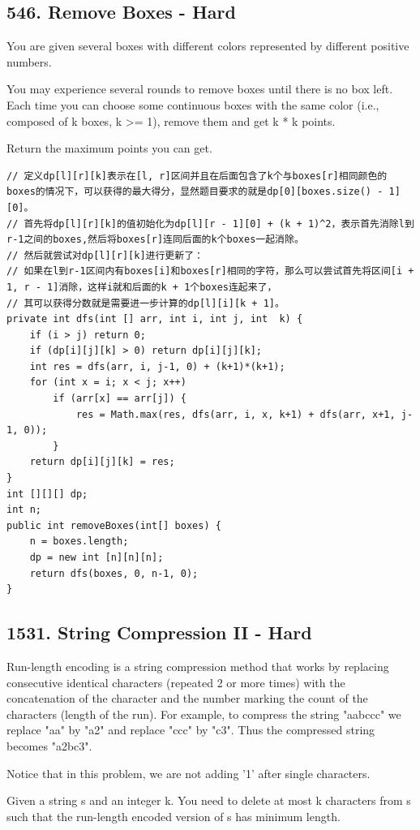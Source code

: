 \documentclass[9pt, b5paaper]{book}
\begin{document}
\subsection{546. Remove Boxes - Hard}
\label{sec-1-4-35}
You are given several boxes with different colors represented by different positive numbers.

You may experience several rounds to remove boxes until there is no box left. Each time you can choose some continuous boxes with the same color (i.e., composed of k boxes, k >= 1), remove them and get k * k points.

Return the maximum points you can get.
\begin{verbatim}
// 定义dp[l][r][k]表示在[l, r]区间并且在后面包含了k个与boxes[r]相同颜色的boxes的情况下，可以获得的最大得分，显然题目要求的就是dp[0][boxes.size() - 1][0]。
// 首先将dp[l][r][k]的值初始化为dp[l][r - 1][0] + (k + 1)^2，表示首先消除l到r-1之间的boxes,然后将boxes[r]连同后面的k个boxes一起消除。
// 然后就尝试对dp[l][r][k]进行更新了：
// 如果在l到r-1区间内有boxes[i]和boxes[r]相同的字符，那么可以尝试首先将区间[i + 1, r - 1]消除，这样i就和后面的k + 1个boxes连起来了，
// 其可以获得分数就是需要进一步计算的dp[l][i][k + 1]。
private int dfs(int [] arr, int i, int j, int  k) {
    if (i > j) return 0;
    if (dp[i][j][k] > 0) return dp[i][j][k];
    int res = dfs(arr, i, j-1, 0) + (k+1)*(k+1);
    for (int x = i; x < j; x++) 
        if (arr[x] == arr[j]) {
            res = Math.max(res, dfs(arr, i, x, k+1) + dfs(arr, x+1, j-1, 0));
        }
    return dp[i][j][k] = res;
}
int [][][] dp;
int n;
public int removeBoxes(int[] boxes) {
    n = boxes.length;
    dp = new int [n][n][n];
    return dfs(boxes, 0, n-1, 0);
}
\end{verbatim}
\subsection{1531. String Compression II - Hard}
\label{sec-1-4-36}
Run-length encoding is a string compression method that works by replacing consecutive identical characters (repeated 2 or more times) with the concatenation of the character and the number marking the count of the characters (length of the run). For example, to compress the string "aabccc" we replace "aa" by "a2" and replace "ccc" by "c3". Thus the compressed string becomes "a2bc3".

Notice that in this problem, we are not adding '1' after single characters.

Given a string s and an integer k. You need to delete at most k characters from s such that the run-length encoded version of s has minimum length.
\end{document}
